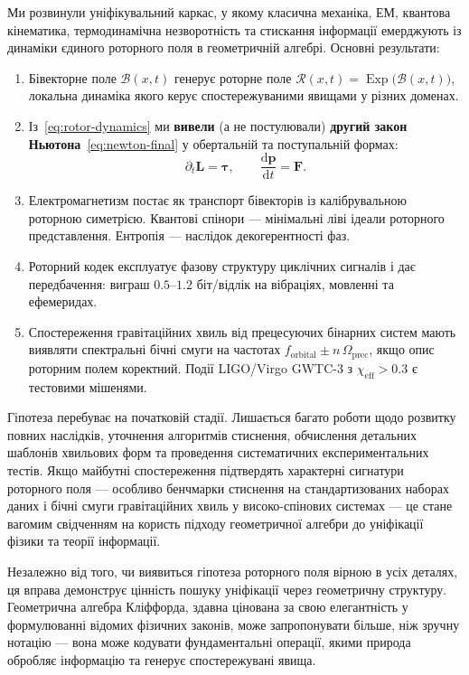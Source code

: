 \documentclass[11pt,a4paper]{article}
\newcommand{\Exp}{\operatorname{Exp}}
\newcommand{\Rotor}{\mathcal{R}}
\newcommand{\Biv}{\mathcal{B}}
\theoremstyle{definition}
\theoremstyle{plain}
\theoremstyle{remark}
\begin{document}
Ми розвинули уніфікувальний каркас, у якому класична механіка, ЕМ, квантова кінематика, термодинамічна незворотність та стискання інформації емерджують із динаміки єдиного роторного поля в геометричній алгебрі. Основні результати:

\begin{enumerate}
  \item Бівекторне поле $\Biv(x,t)$ генерує роторне поле $\Rotor(x,t)=\Exp\!\big(\Biv(x,t)\big)$, локальна динаміка якого керує спостережуваними явищами у різних доменах.
  \item Із~\eqref{eq:rotor-dynamics} ми \textbf{вивели} (а не постулювали) \textbf{другий закон Ньютона}~\eqref{eq:newton-final} у обертальній та поступальній формах:
  \begin{equation*}
  \partial_t \bm{L} = \bm{\tau}, \qquad \frac{\mathrm{d}\mathbf{p}}{\mathrm{d}t} = \mathbf{F}.
  \end{equation*}
  \item Електромагнетизм постає як транспорт бівекторів із калібрувальною роторною симетрією. Квантові спінори — мінімальні ліві ідеали роторного представлення. Ентропія — наслідок декогерентності фаз.
  \item Роторний кодек експлуатує фазову структуру циклічних сигналів і дає передбачення: виграш $0.5$–$1.2$ біт/відлік на вібраціях, мовленні та ефемеридах.
  \item Спостереження гравітаційних хвиль від прецесуючих бінарних систем мають виявляти спектральні бічні смуги на частотах $f_{\text{orbital}} \pm n\,\Omega_{\text{prec}}$, якщо опис роторним полем коректний. Події LIGO/Virgo GWTC-3 з $\chi_{\text{eff}} > 0.3$ є тестовими мішенями.
\end{enumerate}

Гіпотеза перебуває на початковій стадії. Лишається багато роботи щодо розвитку повних наслідків, уточнення алгоритмів стиснення, обчислення детальних шаблонів хвильових форм та проведення систематичних експериментальних тестів. Якщо майбутні спостереження підтвердять характерні сигнатури роторного поля — особливо бенчмарки стиснення на стандартизованих наборах даних і бічні смуги гравітаційних хвиль у високо-спінових системах — це стане вагомим свідченням на користь підходу геометричної алгебри до уніфікації фізики та теорії інформації.

Незалежно від того, чи виявиться гіпотеза роторного поля вірною в усіх деталях, ця вправа демонструє цінність пошуку уніфікації через геометричну структуру. Геометрична алгебра Кліффорда, здавна цінована за свою елегантність у формулюванні відомих фізичних законів, може запропонувати більше, ніж зручну нотацію — вона може кодувати фундаментальні операції, якими природа обробляє інформацію та генерує спостережувані явища.
\end{document}
